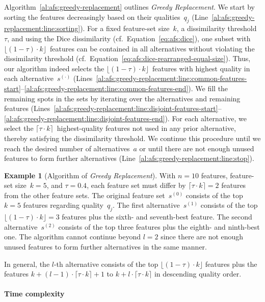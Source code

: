 \documentclass{article}
\theoremstyle{definition}
\newtheorem{example}{Example}
\begin{document}
Algorithm~\ref{al:afs:greedy-replacement} outlines \emph{Greedy Replacement}.
We start by sorting the features decreasingly based on their qualities~$q_j$ (Line~\ref{al:afs:greedy-replacement:line:sorting}).
For a fixed feature-set size~$k$, a dissimilarity threshold~$\tau$, and using the Dice dissimilarity (cf.~Equation~\ref{eq:afs:dice}), one subset with $\lfloor (1 - \tau) \cdot k \rfloor$~features can be contained in all alternatives without violating the dissimilarity threshold (cf.~Equation~\ref{eq:afs:dice-rearranged-equal-size}).
Thus, our algorithm indeed selects the $\lfloor (1 - \tau) \cdot k \rfloor$~features with highest quality in each alternative~$s^{(\cdot)}$ (Lines~\ref{al:afs:greedy-replacement:line:common-features-start}--\ref{al:afs:greedy-replacement:line:common-features-end}).
We fill the remaining spots in the sets by iterating over the alternatives and remaining features (Lines~\ref{al:afs:greedy-replacement:line:disjoint-features-start}--\ref{al:afs:greedy-replacement:line:disjoint-features-end}).
For each alternative, we select the $\lceil \tau \cdot k \rceil$~highest-quality features not used in any prior alternative, thereby satisfying the dissimilarity threshold.
We continue this procedure until we reach the desired number of alternatives~$a$ or until there are not enough unused features to form further alternatives (Line~\ref{al:afs:greedy-replacement:line:stop}).
%
\begin{example}[Algorithm of \emph{Greedy Replacement}]
	With $n=10$ features, feature-set size~$k=5$, and $\tau=0.4$, each feature set must differ by $\lceil \tau \cdot k \rceil = 2$ features from the other feature sets.
	The original feature set~$s^{(0)}$ consists of the top $k=5$ features regarding quality~$q_j$.
	The first alternative~$s^{(1)}$ consists of the top $\lfloor (1 - \tau) \cdot k \rfloor = 3$ features plus the sixth- and seventh-best feature.
	The second alternative~$s^{(2)}$ consists of the top three features plus the eighth- and ninth-best one.
	The algorithm cannot continue beyond $l=2$ since there are not enough unused features to form further alternatives in the same manner.
	\label{ex:afs:greedy-replacement:algorithm}
\end{example}
%
In general, the $l$-th alternative consists of the top $\lfloor (1 - \tau) \cdot k \rfloor$ features plus the features $k + (l-1) \cdot \lceil \tau \cdot k \rceil + 1$ to $k + l \cdot \lceil \tau \cdot k \rceil$ in descending quality order.

\paragraph{Time complexity}
\end{document}
